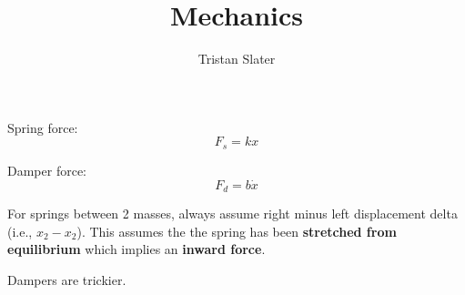 \documentclass{article}
\title{Mechanics}
\author{Tristan Slater}
\begin{document}
    \maketitle

    Spring force: \begin{equation}
        F_s = kx
    \end{equation}

    Damper force: \begin{equation}
        F_d = b\dot{x}
    \end{equation}

    For springs between 2 masses, always assume right minus left displacement delta (i.e., $x_2 - x_2$). This assumes the the spring has been \textbf{stretched from equilibrium} which implies an \textbf{inward force}.

    Dampers are trickier.
\end{document}
